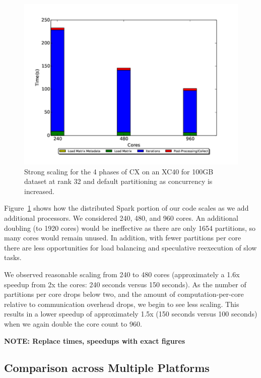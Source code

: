    \begin{figure} [H]
    \begin{centering}
    \includegraphics[scale=0.4]{images/CX_Strong_Scaling_Rank_32_Partitions_default.pdf}
    \end{centering}
    \caption{ Strong scaling for the 4 phases of CX on an XC40 for 100GB dataset at rank 32 and default partitioning as concurrency is increased.} 
    \label{fig:xc40scaling}
    \end{figure} 

Figure~\ref{fig:xc40scaling} shows how the distributed Spark portion of our code scales as we add additional processors.  We considered 240, 480, and 960 cores.  An additional doubling (to 1920 cores) would be ineffective as there are only 1654 partitions, so many cores would remain unused.  In addition, with fewer partitions per core there are less opportunities for load balancing and speculative reexecution of slow tasks.

We observed reasonable scaling from 240 to 480 cores (approximately a 1.6x speedup from 2x the cores: 240 seconds versus 150 seconds).  As the number of partitions per core drops below two, and the amount of computation-per-core relative to communication overhead drops, we begin to see less scaling.  This results in a lower speedup of approximately 1.5x (150 seconds versus 100 seconds) when we again double the core count to 960.

\textbf{NOTE: Replace times, speedups with exact figures}

  \subsection{Comparison across Multiple Platforms}
  \label{sect:h2h}
    
